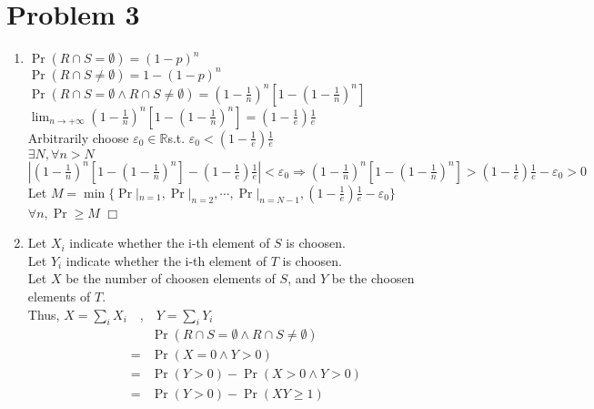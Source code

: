\documentclass[12pt]{article}
\def\qed{\hfill\mbox{$\Box$}}
\def\R{\mathbb{R}}
\begin{document}
\section*{Problem 3}
\begin{enumerate}[(1)]
\item
	$\Pr(R\cap S=\emptyset)=(1-p)^n$\\
	$\Pr(R\cap S\neq\emptyset)=1-(1-p)^n$\\
	$\Pr(R\cap S=\emptyset\wedge R\cap S\neq\emptyset)=(1-\frac{1}{n})^n[1-(1-\frac{1}{n})^n]$\\
	$\lim_{n\to+\infty}(1-\frac{1}{n})^n[1-(1-\frac{1}{n})^n]=(1-\frac{1}{e})\frac{1}{e}$\\
	
	Arbitrarily choose $\varepsilon_0\in\R$\qquad s.t. $\varepsilon_0 < (1-\frac{1}{e})\frac{1}{e}$\\
	$\exists N, \forall n>N$\\ 
	$|(1-\frac{1}{n})^n[1-(1-\frac{1}{n})^n]-(1-\frac{1}{e})\frac{1}{e}|<\varepsilon_0\Rightarrow (1-\frac{1}{n})^n[1-(1-\frac{1}{n})^n]>(1-\frac{1}{e})\frac{1}{e}-\varepsilon_0>0$\\
	Let $M=\min\{\Pr|_{n=1},\Pr|_{n=2},\cdots,\Pr|_{n=N-1},(1-\frac{1}{e})\frac{1}{e}-\varepsilon_0\}$\\
	
	$\forall n, \Pr\geq M$
	\qed

\item
	Let $X_i$ indicate whether the i-th element of $S$ is choosen.\\
	Let $Y_i$ indicate whether the i-th element of $T$ is choosen.\\
	Let $X$ be the number of choosen elements of $S$, and $Y$ be the choosen elements of $T$.\\
	Thus, $X=\sum_i X_i$~~,~~$Y=\sum_i Y_i$\\
	\begin{align*}
	&\Pr(R\cap S=\emptyset\wedge R\cap S\neq\emptyset)\\
	=&\Pr(X=0\wedge Y>0)\\
	=&\Pr(Y>0)-\Pr(X>0\wedge Y>0)	\\
	=&\Pr(Y>0)-\Pr(XY\geq 1)
	\end{align*}		
	

\end{enumerate}
\end{document}
